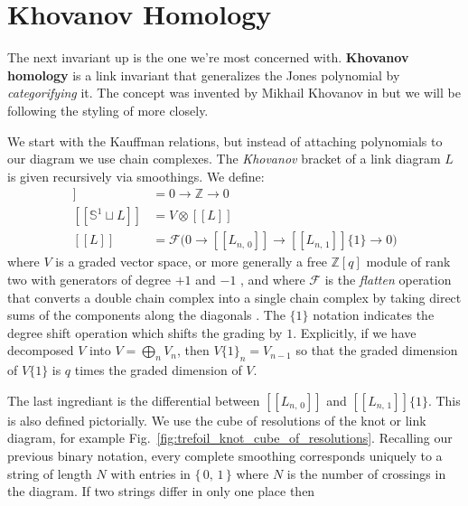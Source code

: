 \section{Khovanov Homology}
    The next invariant up is the one we're most concerned with.
    \textbf{Khovanov homology} is a link invariant that generalizes the
    Jones polynomial by \textit{categorifying} it. The concept was invented by
    Mikhail Khovanov in \cite{Khovanov1999CatJonesPoly} but we will be
    following the styling of \cite{BarNatanKhovanovJones} more closely.
    \par\hfill\par
    We start with the Kauffman relations, but instead of attaching polynomials
    to our diagram we use chain complexes. The \textit{Khovanov} bracket of a
    link diagram $L$ is given recursively via smoothings. We define:
    \begin{align}
        [[\emptyset]]&=0\rightarrow\mathbb{Z}\rightarrow{0}\\
        [[\mathbb{S}^{1}\sqcup{L}]]&=V\otimes[[L]]\\
        [[L]]&=\mathcal{F}
        \big(
            0\rightarrow[[L_{n,\,0}]]\rightarrow[[L_{n,\,1}]]\{1\}\rightarrow{0}
        \big)
    \end{align}
    where $V$ is a graded vector space,
    or more generally a free $\mathbb{Z}[q]$
    module of rank two with generators of degree $+1$ and $-1$
    \cite[p.~362]{Khovanov1999CatJonesPoly}, and where
    $\mathcal{F}$ is the \textit{flatten} operation that converts a
    double chain complex into a single chain complex by taking direct sums
    of the components along the diagonals \cite[p.~338]{BarNatanKhovanovJones}.
    The $\{1\}$ notation indicates the degree shift operation which shifts the
    grading by $1$. Explicitly, if we have decomposed $V$ into
    $V=\bigoplus_{n}V_{n}$, then $V\{1\}_{n}=V_{n-1}$ so that the graded
    dimension of $V\{1\}$ is $q$ times the graded dimension of $V$.
    \par\hfill\par
    The last ingrediant is the differential between $[[L_{n,\,0}]]$ and
    $[[L_{n,\,1}]]\{1\}$. This is also defined pictorially. We use the cube of
    resolutions of the knot or link diagram, for example
    Fig.~\ref{fig:trefoil_knot_cube_of_resolutions}. Recalling our previous
    binary notation, every complete smoothing corresponds uniquely to a string
    of length $N$ with entries in $\{\,0,\,1\,\}$ where $N$ is the number of
    crossings in the diagram. If two strings differ in only one place then
